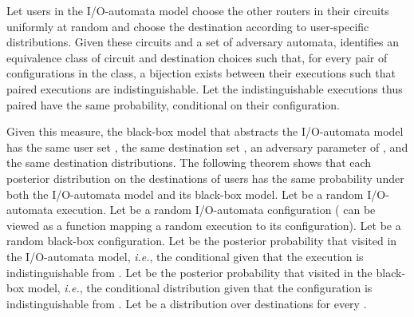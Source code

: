 \documentclass[prodmode,acmtissec]{acmsmall}
\begin{document}
Let users in the I/O-automata model choose the other routers in their circuits uniformly at random and choose the destination according to user-specific distributions.  Given these circuits and a set of adversary automata,  identifies an equivalence class of circuit and destination choices such that, for every pair of configurations in the class, a bijection exists between their executions such that paired executions are indistinguishable.  Let the indistinguishable executions thus paired have the same probability, conditional on their configuration.

Given this measure, the black-box model that abstracts the I/O-automata model has the same user set , the same destination set , an adversary parameter of , and the same destination distributions.  The following theorem shows that each posterior distribution on the destinations of users has the same probability under both the I/O-automata model and its black-box model.  Let  be a random I/O-automata execution.  Let  be a random I/O-automata configuration ( can be viewed as a function mapping a random execution to its configuration).  Let  be a random black-box configuration.  Let  be the posterior probability that  visited  in the I/O-automata model, \emph{i.e.}, the conditional given that the execution is indistinguishable from .  Let  be the posterior probability that  visited  in the black-box model, \emph{i.e.}, the conditional distribution given that the configuration is indistinguishable from .  Let  be a distribution over destinations  for every .
\begin{theorem}

\end{theorem}
\end{document}
